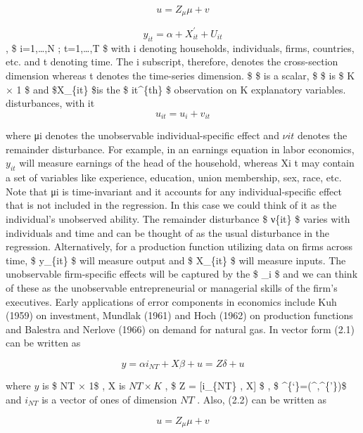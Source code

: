 \documentclass[
]{book}
\begin{document}
\begin{equation} u=Z_\mu \mu +v  \end{equation}

\[  y_{it} = \alpha + X_{it}^{'} + U_{it}   \] , \$ i=1,\ldots,N ; t=1,\ldots,T \$ with i denoting households, individuals, firms, countries, etc. and t denoting time. The i subscript, therefore, denotes the cross-section dimension whereas t denotes the time-series dimension. \$ \alpha \$ is a scalar, \$ \beta \$ is \$ K × 1 \$ and \$X\_\{it\} \$is the \$ it\^{}\{th\} \$ observation on K explanatory variables. disturbances, with it \[ u_{it}=u_i  + v_{it}     \]

where μi denotes the unobservable individual-specific effect and \(ν{it}\) denotes the remainder disturbance. For example, in an earnings equation in labor economics, \(y_{it}\) will measure earnings of the head of the household, whereas Xi t may contain a set of variables like experience, education, union membership, sex, race, etc. Note that μi is time-invariant and it accounts for any individual-specific effect that is not included in the regression. In this case we could think of it as the individual's unobserved ability. The remainder disturbance \$ ν\{it\} \$ varies with individuals and time and can be thought of as the usual disturbance in the regression. Alternatively, for a production function utilizing data on firms across time, \$ y\_\{it\} \$ will measure output and \$ X\_\{it\} \$ will measure inputs. The unobservable firm-specific effects will be captured by the \$ \mu\_i \$ and we can think of these as the unobservable entrepreneurial or managerial skills of the firm's executives. Early applications of error components in economics include Kuh (1959) on investment, Mundlak (1961) and Hoch (1962) on production functions and Balestra and Nerlove (1966) on demand for natural gas. In vector form (2.1) can be written as

\[ y= \alpha i_{NT}  + X\beta +u = Z\delta + u \]

where \(y\) is \$ NT × 1\$ , X is \(NT × K\) , \$ Z = {[}i\_\{NT\} , X{]} \$ , \$ \delta\^{}\{`\}=(\^{},\beta\^{}\{'\})\$ and \(i_{NT}\) is a vector of ones of dimension \(NT\) . Also, (2.2) can be written as

\begin{equation} u=Z_\mu \mu  + v\end{equation}
\end{document}
